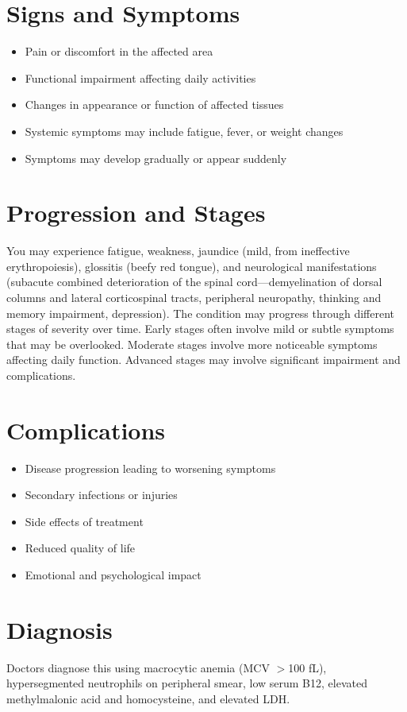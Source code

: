 \section{Signs and Symptoms}
\begin{itemize}[noitemsep]
  \item Pain or discomfort in the affected area
  \item Functional impairment affecting daily activities
  \item Changes in appearance or function of affected tissues
  \item Systemic symptoms may include fatigue, fever, or weight changes
  \item Symptoms may develop gradually or appear suddenly
\end{itemize}
\section{Progression and Stages}
You may experience fatigue, weakness, jaundice (mild, from ineffective erythropoiesis), glossitis (beefy red tongue), and neurological manifestations (subacute combined deterioration of the spinal cord---demyelination of dorsal columns and lateral corticospinal tracts, peripheral neuropathy, thinking and memory impairment, depression). The condition may progress through different stages of severity over time. Early stages often involve mild or subtle symptoms that may be overlooked. Moderate stages involve more noticeable symptoms affecting daily function. Advanced stages may involve significant impairment and complications.
\section{Complications}
\begin{itemize}[noitemsep]
  \item Disease progression leading to worsening symptoms
  \item Secondary infections or injuries
  \item Side effects of treatment
  \item Reduced quality of life
  \item Emotional and psychological impact
\end{itemize}
\section{Diagnosis}
Doctors diagnose this using macrocytic anemia (MCV $>$100 fL), hypersegmented neutrophils on peripheral smear, low serum B12, elevated methylmalonic acid and homocysteine, and elevated LDH.


